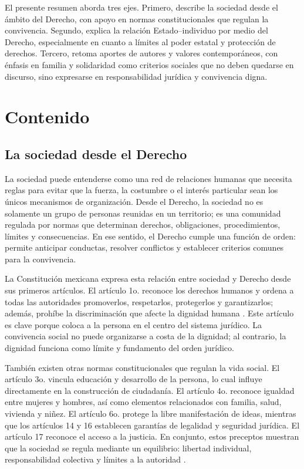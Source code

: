 \documentclass[
	spanish,
	letterpaper, oneside
]{article}
\begin{document}
El presente resumen aborda tres ejes. Primero, describe la sociedad desde el ámbito del Derecho, con apoyo en normas constitucionales que regulan la convivencia. Segundo, explica la relación Estado--individuo por medio del Derecho, especialmente en cuanto a límites al poder estatal y protección de derechos. Tercero, retoma aportes de autores y valores contemporáneos, con énfasis en familia y solidaridad como criterios sociales que no deben quedarse en discurso, sino expresarse en responsabilidad jurídica y convivencia digna.

\section{Contenido}

\subsection{La sociedad desde el Derecho}

La sociedad puede entenderse como una red de relaciones humanas que necesita reglas para evitar que la fuerza, la costumbre o el interés particular sean los únicos mecanismos de organización. Desde el Derecho, la sociedad no es solamente un grupo de personas reunidas en un territorio; es una comunidad regulada por normas que determinan derechos, obligaciones, procedimientos, límites y consecuencias. En ese sentido, el Derecho cumple una función de orden: permite anticipar conductas, resolver conflictos y establecer criterios comunes para la convivencia.

La Constitución mexicana expresa esta relación entre sociedad y Derecho desde sus primeros artículos. El artículo 1o. reconoce los derechos humanos y ordena a todas las autoridades promoverlos, respetarlos, protegerlos y garantizarlos; además, prohíbe la discriminación que afecte la dignidad humana \citep{constitucionCPEUM2026}. Este artículo es clave porque coloca a la persona en el centro del sistema jurídico. La convivencia social no puede organizarse a costa de la dignidad; al contrario, la dignidad funciona como límite y fundamento del orden jurídico.

También existen otras normas constitucionales que regulan la vida social. El artículo 3o. vincula educación y desarrollo de la persona, lo cual influye directamente en la construcción de ciudadanía. El artículo 4o. reconoce igualdad entre mujeres y hombres, así como elementos relacionados con familia, salud, vivienda y niñez. El artículo 6o. protege la libre manifestación de ideas, mientras que los artículos 14 y 16 establecen garantías de legalidad y seguridad jurídica. El artículo 17 reconoce el acceso a la justicia. En conjunto, estos preceptos muestran que la sociedad se regula mediante un equilibrio: libertad individual, responsabilidad colectiva y límites a la autoridad \citep{constitucionCPEUM2026}.
\end{document}
